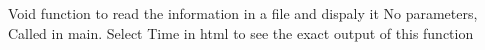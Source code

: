 Void function to read the information in a file and dispaly it No parameters, Called in main. Select Time in html to see the exact output of this function 